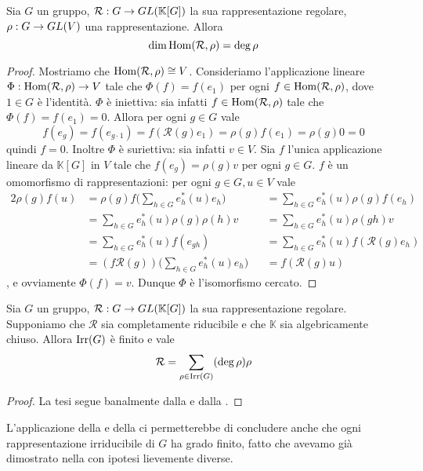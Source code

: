 \begin{proposition}
Sia $G$ un gruppo, $\mathcal{R}:G\to GL(\mathbb{K}[G])$ la sua rappresentazione regolare, $\rho:G\to GL(V)$ una rappresentazione. Allora 
$$
\dim\operatorname{Hom}(\mathcal{R},\rho)=\deg\rho
$$
\end{proposition}
\begin{proof}
Mostriamo che $\operatorname{Hom}(\mathcal{R},\rho)\cong V$. Consideriamo l'applicazione lineare
$\Phi:\operatorname{Hom}(\mathcal{R},\rho)\to V$ tale che $\Phi(f)=f(e_1)$ per ogni $f\in\operatorname{Hom}(\mathcal{R},\rho)$, dove $1\in G$ è l'identità. $\Phi$ è iniettiva: sia infatti $f\in\operatorname{Hom}(\mathcal{R},\rho)$ tale che $\Phi(f)=f(e_1)=0$. Allora per ogni $g\in G$ vale
$$
f(e_g)=f(e_{g\cdot1})=f(\mathcal{R}(g)e_1)=\rho(g)f(e_1)=\rho(g)0=0
$$
quindi $f=0$. Inoltre $\Phi$ è suriettiva: sia infatti $v\in V$. Sia $f$ l'unica applicazione lineare da $\mathbb{K}[G]$ in $V$ tale che $f(e_g)=\rho(g)v$ per ogni $g\in G$. $f$ è un omomorfismo di rappresentazioni: per ogni $g\in G,u\in V$ vale
\begin{alignat*}{2}
\rho(g)f(u)&=\rho(g)f\biggl(\sum_{h\in G}e_h^*(u)e_h\biggr)
&&=\sum_{h\in G}e_h^*(u)\rho(g)f(e_h)\\
&=\sum_{h\in G}e_h^*(u)\rho(g)\rho(h)v
&&=\sum_{h\in G}e_h^*(u)\rho(gh)v\\
&=\sum_{h\in G}e_h^*(u)f(e_{gh})
&&=\sum_{h\in G}e_h^*(u)f(\mathcal{R}(g)e_h)\\
&=(f\mathcal{R}(g))\biggl(\sum_{h\in G}e_h^*(u)e_h\biggr)&&=f(\mathcal{R}(g)u)
\end{alignat*}
, e ovviamente $\Phi(f)=v$. Dunque $\Phi$ è l'isomorfismo cercato.
\end{proof}

\begin{corollary}
Sia $G$ un gruppo, $\mathcal{R}:G\to GL(\mathbb{K}[G])$ la sua rappresentazione regolare. Supponiamo che $\mathcal{R}$ sia completamente riducibile e che $\mathbb{K}$ sia algebricamente chiuso. Allora $\operatorname{Irr}(G)$ è finito e vale
$$
\mathcal{R}=\sum_{\rho\in\operatorname{Irr}(G)}(\deg\rho)\rho
$$
\end{corollary}
\begin{proof}
La tesi segue banalmente dalla  e dalla .
\end{proof}

\begin{remark}
L'applicazione della  e della  ci permetterebbe di concludere anche che ogni rappresentazione irriducibile di $G$ ha grado finito, fatto che avevamo già dimostrato nella  con ipotesi lievemente diverse.
\end{remark}

